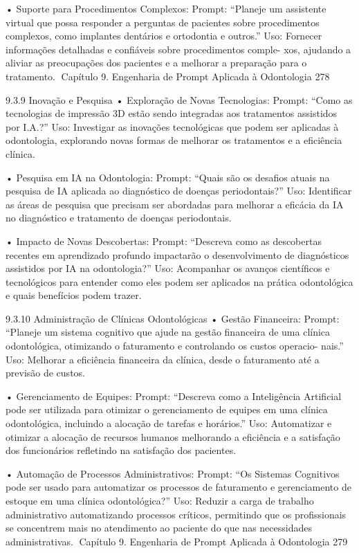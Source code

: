     • Suporte para Procedimentos Complexos:
      Prompt: “Planeje um assistente virtual que possa responder a perguntas de
      pacientes sobre procedimentos complexos, como implantes dentários e ortodontia
      e outros.”
      Uso: Fornecer informações detalhadas e confiáveis sobre procedimentos comple-
      xos, ajudando a aliviar as preocupações dos pacientes e a melhorar a preparação
      para o tratamento.
Capítulo 9. Engenharia de Prompt Aplicada à Odontologia                              278


9.3.9    Inovação e Pesquisa
    • Exploração de Novas Tecnologias:
      Prompt: “Como as tecnologias de impressão 3D estão sendo integradas aos
      tratamentos assistidos por I.A.?”
      Uso: Investigar as inovações tecnológicas que podem ser aplicadas à odontologia,
      explorando novas formas de melhorar os tratamentos e a eficiência clínica.

    • Pesquisa em IA na Odontologia:
      Prompt: “Quais são os desafios atuais na pesquisa de IA aplicada ao diagnóstico
      de doenças periodontais?”
      Uso: Identificar as áreas de pesquisa que precisam ser abordadas para melhorar
      a eficácia da IA no diagnóstico e tratamento de doenças periodontais.

    • Impacto de Novas Descobertas:
      Prompt: “Descreva como as descobertas recentes em aprendizado profundo
      impactarão o desenvolvimento de diagnósticos assistidos por IA na odontologia?”
      Uso: Acompanhar os avanços científicos e tecnológicos para entender como eles
      podem ser aplicados na prática odontológica e quais benefícios podem trazer.

9.3.10     Administração de Clínicas Odontológicas
    • Gestão Financeira:
      Prompt: “Planeje um sistema cognitivo que ajude na gestão financeira de uma
      clínica odontológica, otimizando o faturamento e controlando os custos operacio-
      nais.”
      Uso: Melhorar a eficiência financeira da clínica, desde o faturamento até a
      previsão de custos.

    • Gerenciamento de Equipes:
      Prompt: “Descreva como a Inteligência Artificial pode ser utilizada para otimizar o
      gerenciamento de equipes em uma clínica odontológica, incluindo a alocação de
      tarefas e horários.”
      Uso: Automatizar e otimizar a alocação de recursos humanos melhorando a
      eficiência e a satisfação dos funcionários refletindo na satisfação dos pacientes.

    • Automação de Processos Administrativos:
      Prompt: “Os Sistemas Cognitivos pode ser usado para automatizar os processos
      de faturamento e gerenciamento de estoque em uma clínica odontológica?”
      Uso: Reduzir a carga de trabalho administrativo automatizando processos críticos,
      permitindo que os profissionais se concentrem mais no atendimento ao paciente
      do que nas necessidades administrativas.
Capítulo 9. Engenharia de Prompt Aplicada à Odontologia                             279


